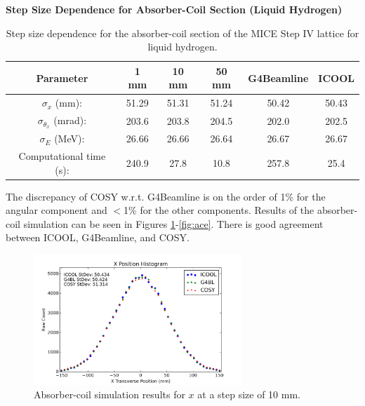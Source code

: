 \begin{table}
\caption*{\textbf{Step Size Dependence for Absorber-Coil Section (Liquid Hydrogen)}}
\begin{center}
\begin{tabularx}{\textwidth}{cccccc}
\hline \hline
Parameter &1 mm & 10 mm & 50 mm & G4Beamline & ICOOL\\
\hline
$\sigma_x$ (mm): & 51.29 & 51.31 & 51.24 & 50.42 & 50.43\\
$\sigma_{\theta_x}$ (mrad): & 203.6 & 203.8 & 204.5 & 202.0 & 202.5\\
$\sigma_E$ (MeV): & 26.66 & 26.66 & 26.64 & 26.67 & 26.67\\
Computational time (s): & 240.9 & 27.8 & 10.8 & 257.8 & 25.4\\
\hline
\end{tabularx}
\end{center}
\caption[Step size dependence for the absorber-coil section of the MICE Step IV lattice for liquid hydrogen.]{Step size dependence for the absorber-coil section of the MICE Step IV lattice for liquid hydrogen.}
\label{tbl:mice_step_size_ac}
\end{table}

The discrepancy of COSY w.r.t. G4Beamline is on the order of 1\% for the angular component and $<$1\% for the other components. Results of the absorber-coil simulation can be seen in Figures \ref{fig:acx}-\ref{fig:ace}. There is good agreement between ICOOL, G4Beamline, and COSY.

\begin{figure}[H]
  \centering
    \includegraphics[width=0.7\textwidth]{MICE data/absorber coils/x} 
  \caption{Absorber-coil simulation results for $x$ at a step size of 10 mm.}
  \label{fig:acx}
\end{figure}

